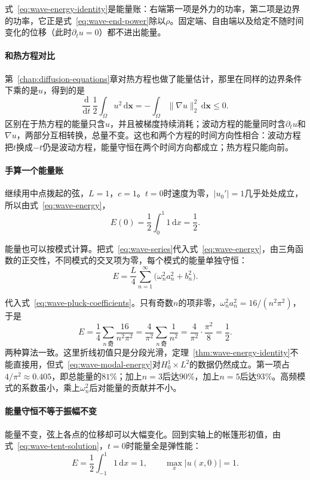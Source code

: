 式~\eqref{eq:wave-energy-identity}是能量账：右端第一项是外力的功率，第二项是边界的功率，它正是式~\eqref{eq:wave-end-power}除以$\rho$。固定端、自由端以及给定不随时间变化的位移（此时$\partial_tu=0$）都不进出能量。

\paragraph{和热方程对比}
第~\ref{chap:diffusion-equations}章对热方程也做了能量估计，那里在同样的边界条件下乘的是$u$，得到的是
\[
 \frac{\mathrm{d}}{\mathrm{d}t}\,\frac12\int_\Omega u^{2}\,\mathrm{d}\bm{x}=-\int_\Omega\lVert\nabla u\rVert_2^{2}\,\mathrm{d}\bm{x}\leq0 .
\]
区别在于热方程的能量只含$u$，并且被梯度持续消耗；波动方程的能量同时含$\partial_tu$和$\nabla u$，两部分互相转换，总量不变。这也和两个方程的时间方向性相合：波动方程把$t$换成$-t$仍是波动方程，能量守恒在两个时间方向都成立；热方程只能向前。

\paragraph{手算一个能量账}
继续用中点拨起的弦，$L=1$，$c=1$。$t=0$时速度为零，$\lvert u_0'\rvert=1$几乎处处成立，所以由式~\eqref{eq:wave-energy}，
\[
 E(0)=\frac12\int_0^{1}1\,\mathrm{d}x=\frac12 .
\]

能量也可以按模式计算。把式~\eqref{eq:wave-series}代入式~\eqref{eq:wave-energy}，由三角函数的正交性，不同模式的交叉项为零，每个模式的能量单独守恒：
\begin{equation}
 E=\frac L4\sum_{n=1}^{\infty}\bigl(\omega_n^{2}a_n^{2}+b_n^{2}\bigr).
 \label{eq:wave-modal-energy}
\end{equation}

代入式~\eqref{eq:wave-pluck-coefficients}。只有奇数$n$的项非零，$\omega_n^{2}a_n^{2}=16/(n^{2}\pi^{2})$，于是
\[
 E=\frac14\sum_{n\ \text{奇}}\frac{16}{n^{2}\pi^{2}}=\frac4{\pi^{2}}\sum_{n\ \text{奇}}\frac1{n^{2}}=\frac4{\pi^{2}}\cdot\frac{\pi^{2}}8=\frac12 .
\]
两种算法一致。这里折线初值只是分段光滑，定理~\ref{thm:wave-energy-identity}不能直接用，但式~\eqref{eq:wave-modal-energy}对$H_0^{1}\times L^{2}$的数据仍然成立。第一项占$4/\pi^{2}\approx0.405$，即总能量的$81\%$；加上$n=3$后达$90\%$，加上$n=5$后达$93\%$。高频模式的系数虽小，乘上$\omega_n^{2}$后对能量的贡献并不小。

\paragraph{能量守恒不等于振幅不变}
能量不变，弦上各点的位移却可以大幅变化。回到实轴上的帐篷形初值，由式~\eqref{eq:wave-tent-solution}，$t=0$时能量全是弹性能：
\[
 E=\frac12\int_{-1}^{1}1\,\mathrm{d}x=1,\qquad \max_{x}\lvert u(x,0)\rvert=1.
\]

